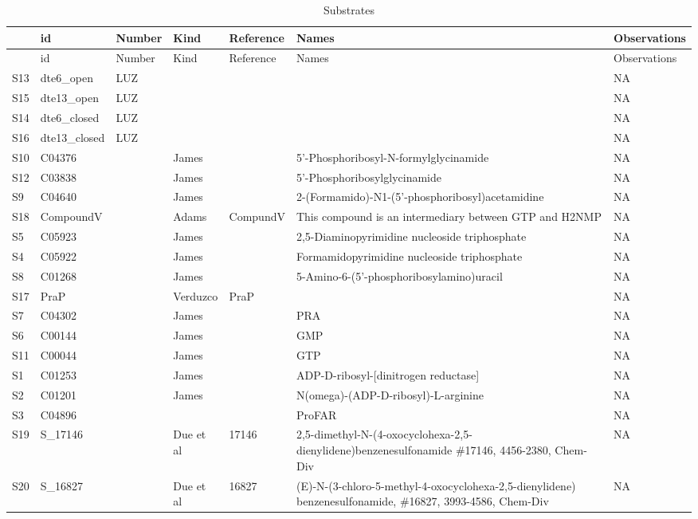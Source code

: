 \documentclass[12pt,twoside]{reedthesis}
\begin{document}
  \begin{longtable}[]{@{}lllllll@{}}
  \caption{Substrates \label{tab:substrates}}\tabularnewline
  \toprule
  & id & Number & Kind & Reference & Names & Observations\tabularnewline
  \midrule
  \endfirsthead
  \toprule
  & id & Number & Kind & Reference & Names & Observations\tabularnewline
  \midrule
  \endhead
  S13 & dte6\_open & LUZ & & & & NA\tabularnewline
  S15 & dte13\_open & LUZ & & & & NA\tabularnewline
  S14 & dte6\_closed & LUZ & & & & NA\tabularnewline
  S16 & dte13\_closed & LUZ & & & & NA\tabularnewline
  S10 & C04376 & & James & & 5'-Phosphoribosyl-N-formylglycinamide &
  NA\tabularnewline
  S12 & C03838 & & James & & 5'-Phosphoribosylglycinamide &
  NA\tabularnewline
  S9 & C04640 & & James & &
  2-(Formamido)-N1-(5'-phosphoribosyl)acetamidine & NA\tabularnewline
  S18 & CompoundV & & Adams & CompundV & This compound is an intermediary
  between GTP and H2NMP & NA\tabularnewline
  S5 & C05923 & & James & & 2,5-Diaminopyrimidine nucleoside triphosphate
  & NA\tabularnewline
  S4 & C05922 & & James & & Formamidopyrimidine nucleoside triphosphate &
  NA\tabularnewline
  S8 & C01268 & & James & & 5-Amino-6-(5'-phosphoribosylamino)uracil &
  NA\tabularnewline
  S17 & PraP & & Verduzco & PraP & & NA\tabularnewline
  S7 & C04302 & & James & & PRA & NA\tabularnewline
  S6 & C00144 & & James & & GMP & NA\tabularnewline
  S11 & C00044 & & James & & GTP & NA\tabularnewline
  S1 & C01253 & & James & & ADP-D-ribosyl-{[}dinitrogen reductase{]} &
  NA\tabularnewline
  S2 & C01201 & & James & & N(omega)-(ADP-D-ribosyl)-L-arginine &
  NA\tabularnewline
  S3 & C04896 & & & & ProFAR & NA\tabularnewline
  S19 & S\_17146 & & Due et al & 17146 &
  2,5-dimethyl-N-(4-oxocyclohexa-2,5-dienylidene)benzenesulfonamide
  \#17146, 4456-2380, Chem-Div & NA\tabularnewline
  S20 & S\_16827 & & Due et al & 16827 &
  (E)-N-(3-chloro-5-methyl-4-oxocyclohexa-2,5-dienylidene)
  benzenesulfonamide, \#16827, 3993-4586, Chem-Div & NA\tabularnewline
  \bottomrule
  \end{longtable}
  
\end{document}
